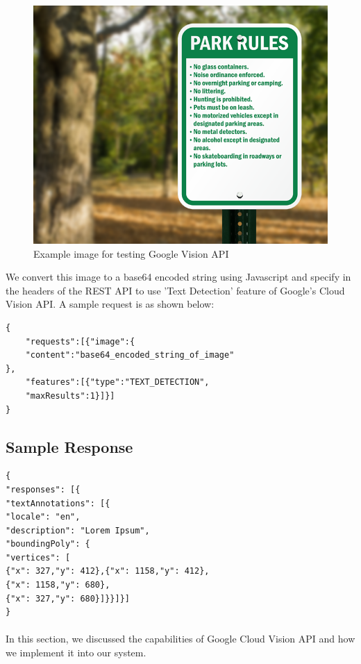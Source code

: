 \documentclass[12pt]{article}
\begin{document}
\begin{figure}[H]
	\centering
	\includegraphics[width=1.0\linewidth]{media/request_sample.png}
	\caption{Example image for testing Google Vision API}
	\label{fig:request_sample}
\end{figure} 

We convert this image to a base64 encoded string using Javascript and specify in the headers of the REST API to use 'Text Detection' feature of Google's Cloud Vision API. A sample request is as shown below:

\begin{lstlisting}
{
	"requests":[{"image":{
	"content":"base64_encoded_string_of_image"
},	
	"features":[{"type":"TEXT_DETECTION",
	"maxResults":1}]}]
}
\end{lstlisting}

\subsection{Sample Response}

\begin{lstlisting}
{
"responses": [{
"textAnnotations": [{
"locale": "en",
"description": "Lorem Ipsum",
"boundingPoly": {
"vertices": [
{"x": 327,"y": 412},{"x": 1158,"y": 412},
{"x": 1158,"y": 680},
{"x": 327,"y": 680}]}}]}]
}
\end{lstlisting}

\paragraph{} In this section, we discussed the capabilities of Google Cloud Vision API and how we implement it into our system. 
\end{document}
